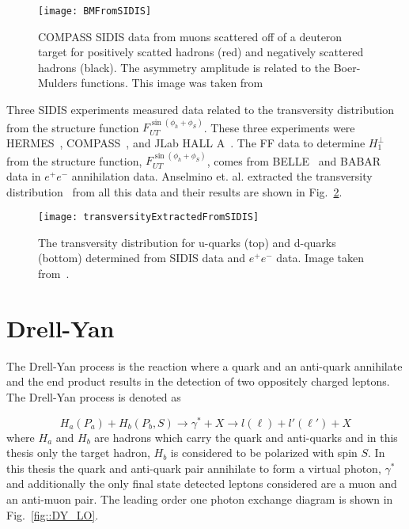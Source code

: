 \begin{figure}[h!t]
  \centering
  \texttt{[image: BMFromSIDIS]}
  \caption{COMPASS SIDIS data from muons scattered off of a deuteron target for
    positively scatted hadrons (red) and negatively scattered hadrons (black).
    The asymmetry amplitude is related to the Boer-Mulders functions.  This
    image was taken from~\cite{Adolph:2014pwc}}
  \label{fig::BMFromSIDIS}
\end{figure}

Three SIDIS experiments measured data related to the transversity distribution
from the structure function $F_{UT}^{\sin(\phi_h +\phi_S)}$.  These three
experiments were HERMES~\cite{Airapetian:2004tw,Airapetian:2010ds},
COMPASS~\cite{Ageev:2006da,Alekseev:2008aa,Alekseev:2010rw,Adolph:2012sn,Adolph:2014zba},
and JLab HALL A~\cite{PhysRevLett.107.072003}.  The FF data to determine
$H_1^{\perp }$ from the structure function, $F_{UT}^{\sin(\phi_h +\phi_S)}$,
comes from BELLE~\cite{Abe:2005zx,Seidl:2008xc} and
BABAR~\cite{TheBABAR:2013yha} data in $e^+e^-$ annihilation data.  Anselmino
et. al. extracted the transversity distribution~\cite{PhysRevD.87.094019} from
all this data and their results are shown in
Fig.~\ref{fig::transversityExtractedFromSIDIS}.

\begin{figure}[h!t]
  \centering \texttt{[image: transversityExtractedFromSIDIS]}
  \caption{The transversity distribution for u-quarks (top) and d-quarks
    (bottom) determined from SIDIS data and $e^+e^-$ data.  Image taken
    from~\cite{PhysRevD.87.094019}.}
  \label{fig::transversityExtractedFromSIDIS}
\end{figure}


\section{Drell-Yan} \label{sec::DY}
The Drell-Yan process is the reaction where a quark and an anti-quark annihilate
and the end product results in the detection of two oppositely charged leptons.
The Drell-Yan process is denoted as

\begin{equation}
  H_a(P_a) + H_b(P_b, S) \rightarrow \gamma^* + X \rightarrow l(\ell) +
  l'(\ell') + X
\end{equation}
\noindent
where $H_a$ and $H_b$ are hadrons which carry the quark and anti-quarks and in
this thesis only the target hadron, $H_b$ is considered to be polarized with
spin $S$.  In this thesis the quark and anti-quark pair annihilate to form a
virtual photon, $\gamma^*$ and additionally the only final state detected
leptons considered are a muon and an anti-muon pair.  The leading order one
photon exchange diagram is shown in Fig.~\ref{fig::DY_LO}.

